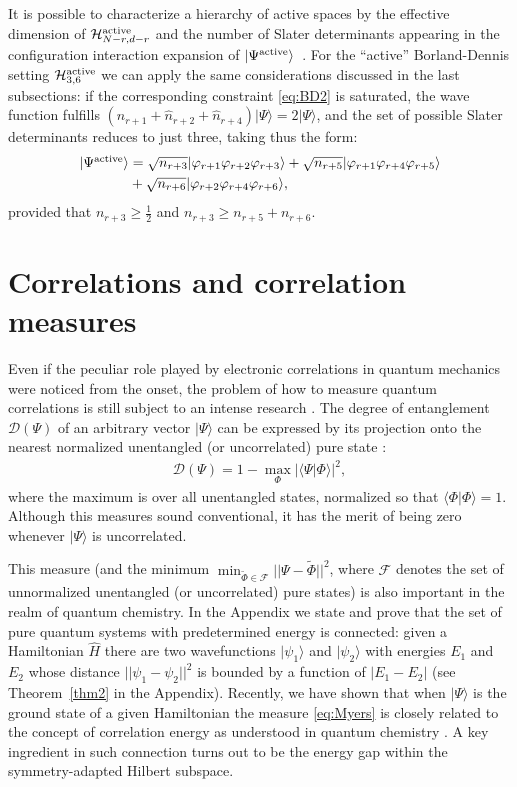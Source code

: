 \documentclass[aps,twocolumn,showpacs,pra,superscriptaddress,floatfix,longbibliography]{revtex4-1}
\newcommand{\7}{\dagger}
\newcommand{\ket}[1]{\mbox{$| #1 \rangle$}}
\renewcommand{\H}{\mathcal{H}}
\begin{document}
It is possible to characterize a hierarchy of active 
spaces by the effective dimension of 
$\H^{\rm active}_{N-r,d-r}$ and the number 
of Slater determinants appearing in the configuration 
interaction expansion of $\ket{\Psi^{\rm active}}$~\cite{TVS17,SBV}. 
For the ``active'' Borland-Dennis setting $\H^{\rm active}_{3,6}$ 
we can apply the same considerations discussed in the last subsections:
if the corresponding constraint \eqref{eq:BD2}
is saturated, the wave function fulfills
$(\hat{n}_{r+1} + \hat{n}_{r+2} + \hat{n}_{r+4})\ket{\Psi} = 2 \ket{\Psi}$, 
and the set of possible Slater determinants reduces to just three,
taking thus the form:
\begin{align}
  \ket{\Psi^{\rm active}} &= \sqrt{n_{r+3}} \ket{\varphi_{r+1}\varphi_{r+2}\varphi_{r+3}}+ 
  \sqrt{n_{r+5}}  \ket{\varphi_{r+1}\varphi_{r+4}\varphi_{r+5}} 
  \nonumber
  \\ &+
 \sqrt{n_{r+6}} \ket{\varphi_{r+2}\varphi_{r+4}\varphi_{r+6}},
  \label{eq:BDstate}
\end{align}
provided that $n_{r+3} \geq \tfrac12$ and 
$n_{r+3} \geq n_{r+5} + n_{r+6}$. 


\section{Correlations and correlation measures}
\label{sec:CM}

Even if the peculiar role played by electronic correlations 
 in quantum mechanics were noticed from the onset,
 the problem of how to measure quantum correlations 
 is still subject to an intense research \cite{Horo,PhysRevA.92.042329}. The degree of entanglement $\mathcal{D}(\Psi)$ of an arbitrary vector 
 $\ket{\Psi}$ can be expressed by its projection onto 
 the nearest normalized unentangled (or uncorrelated)
 pure state \cite{Shimony,Myers2010}:
  \begin{align}
\mathcal{D}(\Psi) = 1 - \max_{\Phi} |\langle\Psi \ket{\Phi}|^2,
  \label{eq:Myers}
  \end{align}
  where the maximum is over all unentangled states, 
  normalized so that $\langle\Phi\ket{\Phi} = 1$.
 Although this measures sound conventional, 
 it has the merit of being zero whenever
  $\ket{\Psi}$ is uncorrelated. 
  
This measure (and the minimum $\min_{\tilde\Phi\in\mathcal{F}} 
|| \Psi - \tilde \Phi||^2$, where $\mathcal{F}$ denotes the set
of unnormalized unentangled (or uncorrelated) pure 
states\cite{Shimony}) is also important in the realm of 
quantum chemistry. 
In the Appendix we state and prove that
the set of pure quantum systems with 
predetermined energy is connected: given a 
Hamiltonian $\hat{H}$ there are two wavefunctions 
$\ket{\psi_1}$ and $\ket{\psi_2}$ with energies $E_1$
and $E_2$ whose distance $|| \psi_1 - \psi_2||^2$ is 
bounded by a function of $|E_1 - E_2|$
(see Theorem~\ref{thm2} in the Appendix).   
Recently, we have shown that when $\ket{\Psi}$ is the 
  ground state of a given Hamiltonian the measure 
  \eqref{eq:Myers} is closely related to the concept of 
  correlation energy as understood in 
  quantum chemistry \cite{newpaper}.
   A key ingredient in such connection turns out to be 
 the energy gap within the symmetry-adapted Hilbert subspace. 
  
\end{document}
